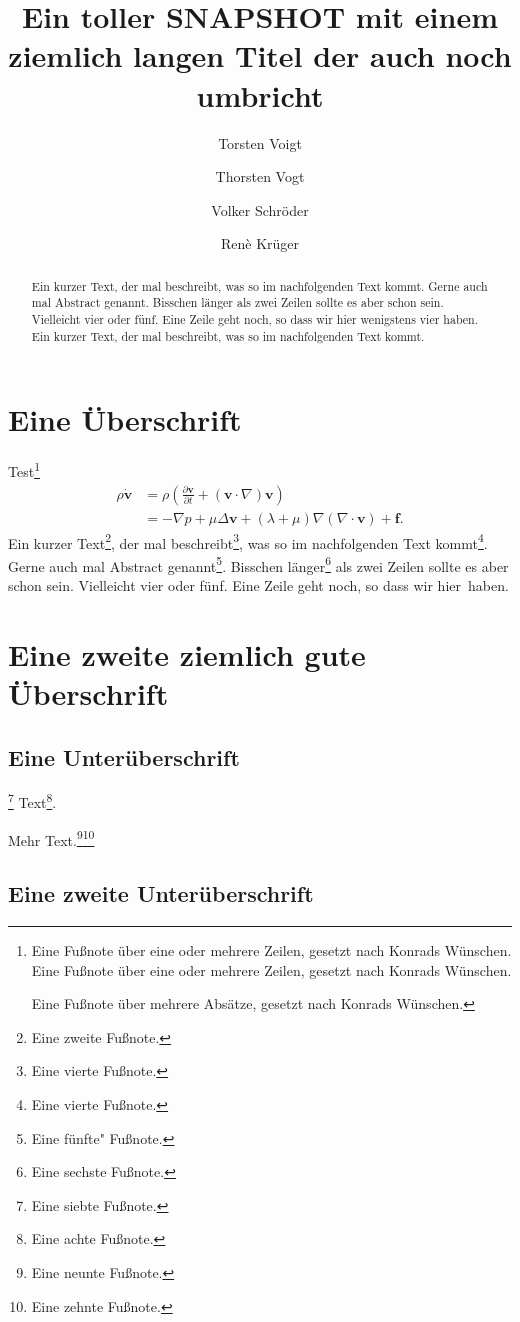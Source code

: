 \documentclass{mfosnapshot}
\author{Torsten Voigt \and Thorsten Vogt \and Volker Schr\"oder \and Ren\`e Kr\"uger}
\title{Ein toller SNAPSHOT mit einem ziemlich langen Titel der auch noch umbricht}
\begin{document}
\begin{abstract}
Ein kurzer Text, der mal beschreibt, was so im nachfolgenden Text kommt. Gerne auch mal Abstract genannt. Bisschen l\"anger als zwei Zeilen sollte es aber schon sein. Vielleicht vier oder f\"unf. Eine Zeile geht noch, so dass wir hier wenigstens vier haben. Ein kurzer Text, der mal beschreibt, was so im nachfolgenden Text kommt.
\end{abstract}

\section{Eine \"Uberschrift}
\noindent\blindtext[1]Test\footnote{Eine Fu\ss note \"uber eine oder mehrere Zeilen, gesetzt nach Konrads W\"unschen. Eine Fu\ss note \"uber eine oder mehrere Zeilen, gesetzt nach Konrads W\"unschen.

Eine Fu\ss note \"uber mehrere Abs\"atze, gesetzt nach Konrads W\"unschen.}
\begin{align}
	\rho \dot{\mathbf{v}}
	 &= \rho \left( \frac{\partial\mathbf{v}}{\partial t} + (\mathbf{v} \cdot \nabla) \mathbf{v} \right)\\
	 &=-\nabla p + \mu \Delta \mathbf{v} + (\lambda + \mu) \nabla (\nabla \cdot \mathbf{v})+\mathbf{f}.
\end{align}
Ein kurzer Text\footnote{Eine zweite Fu\ss note.}, der mal beschreibt\footnote{Eine vierte Fu\ss note.}, was so im nachfolgenden Text kommt\footnote{Eine vierte Fu\ss note.}. Gerne auch mal Abstract genannt\footnote{Eine f\"unfte" Fu\ss note.}. Bisschen l\"anger\footnote{Eine sechste Fu\ss note.} als zwei Zeilen sollte es aber schon sein. Vielleicht vier oder f\"unf. Eine Zeile geht noch, so dass wir hier~haben.

\section{Eine zweite ziemlich gute \"Uberschrift}
\subsection{Eine Unter\"uberschrift}
\blindtext\footnote{Eine siebte Fu\ss note.} Text\footnote{Eine achte Fu\ss note.}.

\blindtext Mehr Text.\footnote{Eine neunte Fu\ss note.}\footnote{Eine zehnte Fu\ss note.}

\subsection{Eine zweite Unter\"uberschrift}
\end{document}
